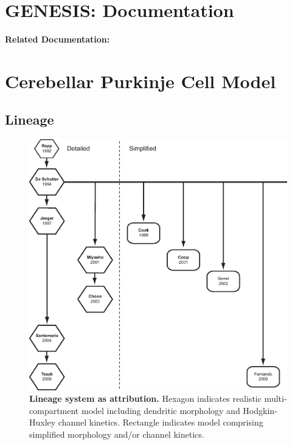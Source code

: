 \documentclass[12pt]{article}
\begin{document}
\section*{GENESIS: Documentation}

{\bf Related Documentation:}

\section*{Cerebellar Purkinje Cell Model}

\subsection*{ Lineage}

\begin{figure}[h]
  \centering
   \includegraphics[scale=0.7]{figures/pc-lineage.eps}
\caption{{\bf Lineage system as attribution.} Hexagon indicates realistic multi-compartment model including dendritic morphology and Hodgkin-Huxley channel kinetics. Rectangle indicates model comprising simplified morphology and/or channel kinetics.}
  \label{fig:pcl-1}
\end{figure}



\end{document}
